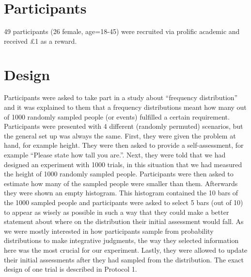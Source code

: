 \documentclass[oneside, 11pt]{book}
\begin{document}
\section{Participants}
49 participants (26 female, age=18-45) were recruited via prolific academic and received \pounds 1 as a reward.
\section{Design}
Participants were asked to take part in a study about ``frequency distribution'' and it was explained to them that a frequency distributions meant how many out of 1000 randomly sampled people (or events) fulfilled a certain requirement. Participants were presented with 4 different (randomly permuted) scenarios, but the general set up was always the same. First, they were given the problem at hand, for example height. They were then asked to provide a self-assessment, for example ``Please state how tall you are.''. Next, they were told that we had designed an experiment with 1000 trials, in this situation that we had measured the height of 1000 randomly sampled people. Participants were then asked to estimate how many of the sampled people were smaller than them. Afterwards they were shown an empty histogram. This histogram contained the 10 bars of the 1000 sampled people and participants were asked to select 5 bars (out of 10) to appear as wisely as possible in such a way that they could make a better statement about where on the distribution their initial assessment would fall. As we were mostly interested in how participants sample from probability distributions to make integrative judgments, the way they selected information here was the most crucial for our experiment. Lastly, they were allowed to update their initial assessments after they had sampled from the distribution. The exact design of one trial is described in Protocol 1.
\end{document}
